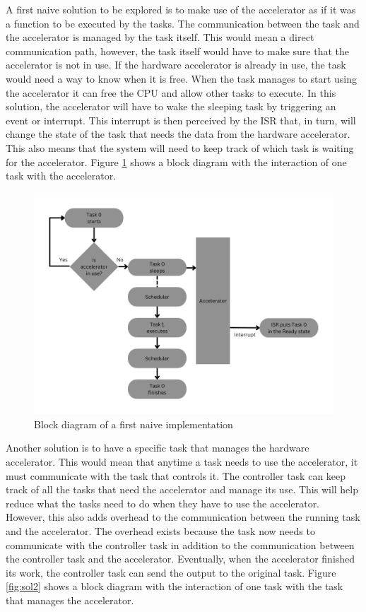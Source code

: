 A first naive solution to be explored is to make use of the accelerator as if it was a function to be executed by the tasks. The communication between the task and the accelerator is managed by the task itself. This would mean a direct communication path, however, the task itself would have to make sure that the accelerator is not in use. If the hardware accelerator is already in use, the task would need a way to know when it is free. When the task manages to start using the accelerator it can free the CPU and allow other tasks to execute. In this solution, the accelerator will have to wake the sleeping task by triggering an event or interrupt. This interrupt is then perceived by the ISR that, in turn, will change the state of the task that needs the data from the hardware accelerator. This also means that the system will need to keep track of which task is waiting for the accelerator. Figure \ref{fig:sol1} shows a block diagram with the interaction of one task with the accelerator.

\begin{figure}[H]
    \centering
    \includegraphics[scale=0.55]{Figures/sol1.png}
    \caption{Block diagram of a first naive implementation}
    \label{fig:sol1}
\end{figure}

Another solution is to have a specific task that manages the hardware accelerator. This would mean that anytime a task needs to use the accelerator, it must communicate with the task that controls it. The controller task can keep track of all the tasks that need the accelerator and manage its use. This will help reduce what the tasks need to do when they have to use the accelerator. However, this also adds overhead to the communication between the running task and the accelerator. The overhead exists because the task now needs to communicate with the controller task in addition to the communication between the controller task and the accelerator. Eventually, when the accelerator finished its work, the controller task can send the output to the original task. Figure \ref{fig:sol2} shows a block diagram with the interaction of one task with the task that manages the accelerator.

